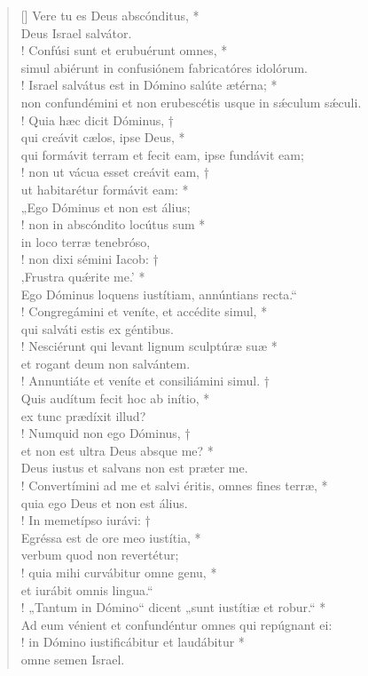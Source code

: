 \begin{verse}[\versewidth]
Vere tu es Deus abscónditus, *\\
Deus Israel salvátor.\\!
\vin Confúsi sunt et erubuérunt omnes, *\\
\vin simul abiérunt in confusiónem fabricatóres idolórum.\\!
Israel salvátus est in Dómino salúte ætérna; *\\
non confundémini et non erubescétis usque in s\'{æ}culum s\'{æ}culi.\\!
\vin Quia hæc dicit Dóminus, †\\
\vin qui creávit cælos, ipse Deus, *\\
\vin qui formávit terram et fecit eam, ipse fundávit eam;\\!
non ut vácua esset creávit eam, †\\
ut habitarétur formávit eam: *\\
„Ego Dóminus et non est álius;\\!
\vin non in abscóndito locútus sum *\\
\vin in loco terræ tenebróso,\\!
non dixi sémini Iacob: †\\
‚Frustra qu\'{æ}rite me.’ *\\
Ego Dóminus loquens iustítiam, annúntians recta.“\\!
\vin Congregámini et veníte, et accédite simul, *\\
\vin qui salváti estis ex géntibus.\\!
Nesciérunt qui levant lignum sculptúræ suæ *\\
et rogant deum non salvántem.\\!
\vin Annuntiáte et veníte et consiliámini simul. †\\
\vin Quis audítum fecit hoc ab inítio, *\\
\vin ex tunc prædíxit illud?\\!
Numquid non ego Dóminus, †\\
et non est ultra Deus absque me? *\\
Deus iustus et salvans non est præter me.\\!
\vin Convertímini ad me et salvi éritis, omnes fines terræ, *\\
\vin quia ego Deus et non est álius.\\!
In memetípso iurávi: †\\
Egréssa est de ore meo iustítia, *\\
verbum quod non revertétur;\\!
\vin quia mihi curvábitur omne genu, *\\
\vin et iurábit omnis lingua.“\\!
„Tantum in Dómino“ dicent „sunt iustítiæ et robur.“ *\\
Ad eum vénient et confundéntur omnes qui repúgnant ei:\\!
\vin in Dómino iustificábitur et laudábitur *\\
\vin omne semen Israel.\\
\end{verse}
\vspace{1cm}



